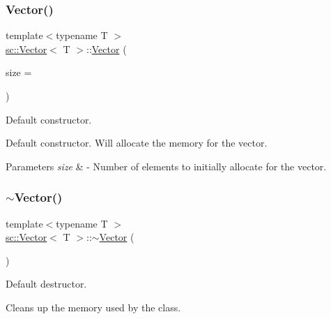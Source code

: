 \subsubsection{\texorpdfstring{Vector()}{Vector()}\hspace{0.1cm}{\footnotesize\ttfamily [1/3]}}
{\footnotesize\ttfamily template$<$typename T $>$ \\
\hyperlink{classsc_1_1Vector}{sc\+::\+Vector}$<$ T $>$\+::\hyperlink{classsc_1_1Vector}{Vector} (\begin{DoxyParamCaption}\item[{size\+\_\+t}]{size = {} }\end{DoxyParamCaption})\hspace{0.3cm}{\ttfamily [inline]}}



Default constructor. 

Default constructor. Will allocate the memory for the vector. 
\begin{DoxyParams}{Parameters}
{\em size} & -\/ Number of elements to initially allocate for the vector. \\
\hline
\end{DoxyParams}
\mbox{\label{classsc_1_1Vector_ad02ec02278095c30e478603bc26eb225}} 
\subsubsection{\texorpdfstring{$\sim$\+Vector()}{~Vector()}}
{\footnotesize\ttfamily template$<$typename T $>$ \\
\hyperlink{classsc_1_1Vector}{sc\+::\+Vector}$<$ T $>$\+::$\sim$\hyperlink{classsc_1_1Vector}{Vector} (\begin{DoxyParamCaption}{ }\end{DoxyParamCaption})\hspace{0.3cm}{\ttfamily [inline]}}



Default destructor. 

Cleans up the memory used by the class. \mbox{\label{classsc_1_1Vector_a2b482471a80d2570089ad1cd68aae03e}} 
